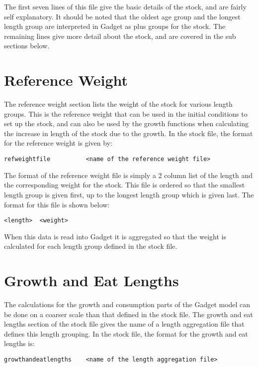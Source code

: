 \documentclass [a4paper, 10pt]{book}
\begin{document}
The first seven lines of this file give the basic details of the stock, and are fairly self explanatory.  It should be noted that the oldest age group and the longest length group are interpreted in Gadget as plus groups for the stock.  The remaining lines give more detail about the stock, and are covered in the sub sections below.

\section{Reference Weight}\label{sec:stockrefweight}
The reference weight section lists the weight of the stock for various length groups.  This is the reference weight that can be used in the initial conditions to set up the stock, and can also be used by the growth functions when calculating the increase in length of the stock due to the growth.  In the stock file, the format for the reference weight is given by:

{\small\begin{verbatim}
refweightfile          <name of the reference weight file>
\end{verbatim}}

The format of the reference weight file is simply a 2 column list of the length and the corresponding weight for the stock.  This file is ordered so that the smallest length group is given first, up to the longest length group which is given last.  The format for this file is shown below:

{\small\begin{verbatim}
<length>  <weight>
\end{verbatim}}

When this data is read into Gadget it is aggregated so that the weight is calculated for each length group defined in the stock file.

\section{Growth and Eat Lengths}\label{sec:stockgrowthlength}
The calculations for the growth and consumption parts of the Gadget model can be done on a coarser scale than that defined in the stock file.  The growth and eat lengths section of the stock file gives the name of a length aggregation file that defines this length grouping.  In the stock file, the format for the growth and eat lengths is:

{\small\begin{verbatim}
growthandeatlengths    <name of the length aggregation file>
\end{verbatim}}
\end{document}
